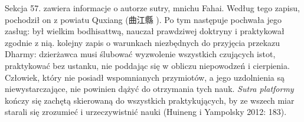 Sekcja 57. zawiera informacje o autorze sutry, mnichu Fahai. Według tego zapisu, pochodził on z powiatu Quxiang (曲江縣 ).
Po tym następuje pochwała jego zasług: był wielkim bodhisattwą, nauczał prawdziwej doktryny i praktykował zgodnie z nią.
kolejny zapis o warunkach niezbędnych do przyjęcia przekazu Dharmy: dzierżawca musi ślubować wyzwolenie wszystkich czujących istot, praktykować bez ustanku, nie poddając się w obliczu niepowodzeń i cierpienia.
Człowiek, który nie posiadł wspomnianych przymiotów, a jego uzdolnienia są niewystarczające, nie powinien dążyć do otrzymania tych nauk.
\textit{Sutra platformy} kończy się zachętą skierowaną do wszystkich praktykujących, by ze wszech miar starali się zrozumieć i urzeczywistnić nauki
(Huineng i Yampolsky 2012: 183).
